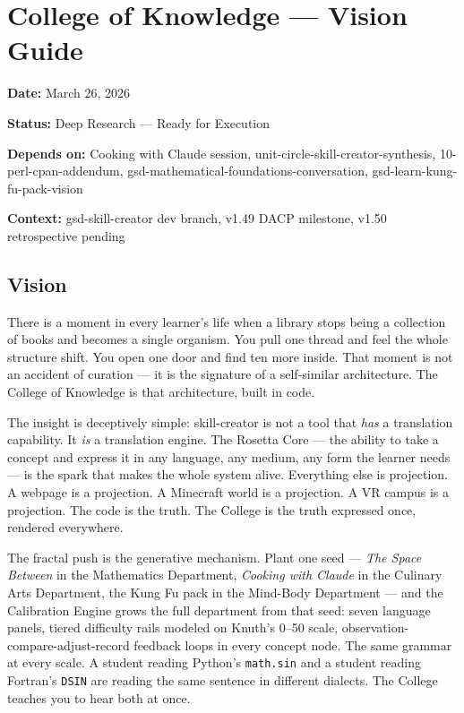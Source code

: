\documentclass[11pt,letterpaper]{article}
\newcommand{\metafield}[2]{\textbf{\sffamily #1} #2\par}
\begin{document}
\section{College of Knowledge --- Vision Guide}

\metafield{Date:}{March 26, 2026}
\metafield{Status:}{Deep Research --- Ready for Execution}
\metafield{Depends on:}{Cooking with Claude session, unit-circle-skill-creator-synthesis, 10-perl-cpan-addendum, gsd-mathematical-foundations-conversation, gsd-learn-kung-fu-pack-vision}
\metafield{Context:}{gsd-skill-creator dev branch, v1.49 DACP milestone, v1.50 retrospective pending}

\subsection{Vision}

There is a moment in every learner's life when a library stops being a collection of books and becomes a single organism. You pull one thread and feel the whole structure shift. You open one door and find ten more inside. That moment is not an accident of curation --- it is the signature of a self-similar architecture. The College of Knowledge is that architecture, built in code.

The insight is deceptively simple: skill-creator is not a tool that \textit{has} a translation capability. It \textit{is} a translation engine. The Rosetta Core --- the ability to take a concept and express it in any language, any medium, any form the learner needs --- is the spark that makes the whole system alive. Everything else is projection. A webpage is a projection. A Minecraft world is a projection. A VR campus is a projection. The code is the truth. The College is the truth expressed once, rendered everywhere.

The fractal push is the generative mechanism. Plant one seed --- \textit{The Space Between} in the Mathematics Department, \textit{Cooking with Claude} in the Culinary Arts Department, the Kung Fu pack in the Mind-Body Department --- and the Calibration Engine grows the full department from that seed: seven language panels, tiered difficulty rails modeled on Knuth's 0--50 scale, observation-compare-adjust-record feedback loops in every concept node. The same grammar at every scale. A student reading Python's \texttt{math.sin} and a student reading Fortran's \texttt{DSIN} are reading the same sentence in different dialects. The College teaches you to hear both at once.
\end{document}
